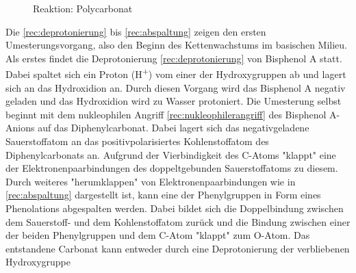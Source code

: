 \begin{figure}[h]
    \begin{center}
        \footnotesize
        \setatomsep{1.7em}


        \vspace{10pt}

        \chemrel{->}

        \caption{Reaktion: Polycarbonat}
        \label{rec:polycarbonat}
    \end{center}
\end{figure}

Die \autoref{rec:deprotonierung} bis \autoref{rec:abspaltung} zeigen den ersten
Umesterungsvorgang, also den Beginn des Kettenwachstums im basischen Milieu.
Als erstes findet die Deprotonierung \autoref{rec:deprotonierung} von Bisphenol
A statt. Dabei spaltet sich ein Proton (H\textsuperscript{+}) vom einer der
Hydroxygruppen ab und lagert sich an das Hydroxidion an. Durch diesen Vorgang
wird das Bisphenol A negativ geladen und das Hydroxidion wird zu Wasser
protoniert. Die Umesterung selbst beginnt mit dem nukleophilen Angriff
\autoref{rec:nukleophilerangriff} des Bisphenol A-Anions auf das
Diphenylcarbonat. Dabei lagert sich das negativgeladene Sauerstoffatom an das
positivpolarisiertes Kohlenstoffatom des Diphenylcarbonats an. Aufgrund der
Vierbindigkeit des C-Atoms "klappt" eine der
Elektronenpaarbindungen des doppeltgebunden Sauerstoffatoms zu diesem. Durch
weiteres "herumklappen" von
Elektronenpaarbindungen wie in \autoref{rec:abspaltung} dargestellt ist, kann
eine der Phenylgruppen in Form eines Phenolations abgespalten werden. Dabei
bildet sich die Doppelbindung zwischen dem Sauerstoff- und dem Kohlenstoffatom
zurück und die Bindung zwischen einer der beiden Phenylgruppen und dem C-Atom
"klappt" zum O-Atom. Das entstandene Carbonat
kann entweder durch eine Deprotonierung der verbliebenen Hydroxygruppe

